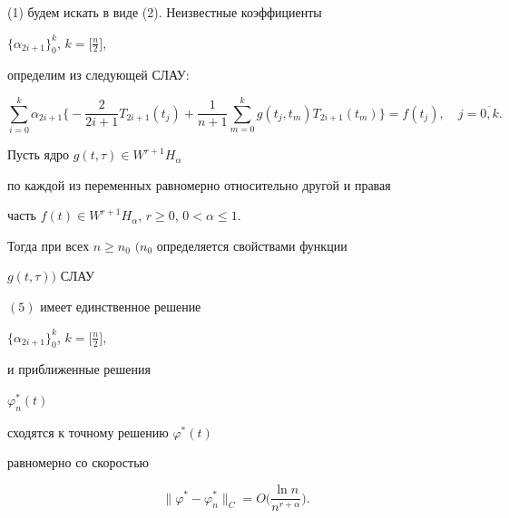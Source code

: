 (1) будем искать в виде (2). Неизвестные коэффициенты


$\{\alpha_{2i+1}\}_{0}^{k}$, $k=\big[\frac{n}{2}\big]$,


определим из следующей СЛАУ:


\begin{equation}


\sum_{i=0}^{k}\alpha_{2i+1}


\bigg\{-\frac{2}{2i+1}T_{2i+1}(t_{j}) +


\frac{1}{n+1}\sum_{m=0}^{k}g(t_{j},t_{m}) T_{2i+1}(t_{m})\bigg\} =


f(t_{j}),\quad


j=\overline{0,k}.


\end{equation}





\begin{thm}


Пусть ядро $g(t,\tau) \in W^{r+1} H_{\alpha}$


по каждой из переменных равномерно относительно другой и правая


часть $f(t) \in W^{r+1} H_{\alpha}$, $r \geq 0$, $0< \alpha \leq 1$.


Тогда при всех $n \geq n_0$ $(n_0$ определяется свойствами функции


$g(t,\tau))$ СЛАУ


$(5)$ имеет единственное решение


$\{\alpha_{2i+1}\}_{0}^{k}$, $k=\big[\frac{n}{2}\big]$,


и приближенные решения


$\varphi_n^*(t)$


сходятся к точному решению $\varphi^*(t)$


равномерно со скоростью


$$


\|\varphi^* - \varphi_n^*\|_C = O\bigg(\frac{\ln n}{n^{r+\alpha}}\bigg).


$$


\end{thm}





